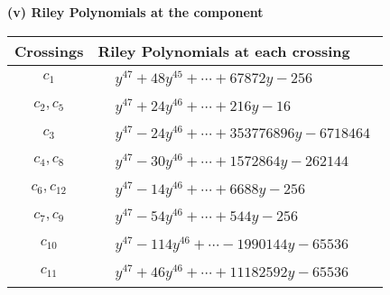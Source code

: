 \documentclass[1p]{elsarticle_modified}
\theoremstyle{definition}
\begin{document}
\newpage\renewcommand{\arraystretch}{1}
\flushleft \textbf{(v) Riley Polynomials at the component}\newline \\
\begin{tabular}{m{50pt}|m{274pt}}
Crossings & \hspace{64pt}Riley Polynomials at each crossing \\
\hline $$\begin{aligned}c_{1}\end{aligned}$$&$\begin{aligned}
&y^{47}+48 y^{45}+\cdots+67872 y-256
\end{aligned}$\\
\hline $$\begin{aligned}c_{2},c_{5}\end{aligned}$$&$\begin{aligned}
&y^{47}+24 y^{46}+\cdots+216 y-16
\end{aligned}$\\
\hline $$\begin{aligned}c_{3}\end{aligned}$$&$\begin{aligned}
&y^{47}-24 y^{46}+\cdots+353776896 y-6718464
\end{aligned}$\\
\hline $$\begin{aligned}c_{4},c_{8}\end{aligned}$$&$\begin{aligned}
&y^{47}-30 y^{46}+\cdots+1572864 y-262144
\end{aligned}$\\
\hline $$\begin{aligned}c_{6},c_{12}\end{aligned}$$&$\begin{aligned}
&y^{47}-14 y^{46}+\cdots+6688 y-256
\end{aligned}$\\
\hline $$\begin{aligned}c_{7},c_{9}\end{aligned}$$&$\begin{aligned}
&y^{47}-54 y^{46}+\cdots+544 y-256
\end{aligned}$\\
\hline $$\begin{aligned}c_{10}\end{aligned}$$&$\begin{aligned}
&y^{47}-114 y^{46}+\cdots-1990144 y-65536
\end{aligned}$\\
\hline $$\begin{aligned}c_{11}\end{aligned}$$&$\begin{aligned}
&y^{47}+46 y^{46}+\cdots+11182592 y-65536
\end{aligned}$\\
\hline
\end{tabular}\\~\\
\end{document}
